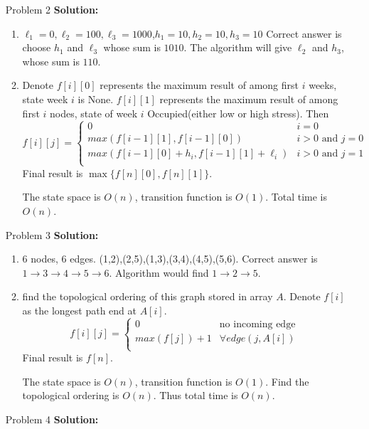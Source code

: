 \normalfont\documentclass[letterpaper,11pt]{article}
\begin{document}
\begin{enumerate}
\item [Problem 2]\textbf{Solution:}\par
	\begin{enumerate}
		\item $\ell_1 = 0, \ell_2 = 100, \ell_3 = 1000$,$h_1 = 10, h_2 = 10, h_3 = 10$
		Correct answer is choose $h_1$ and $\ell_3$ whose sum is $1010$. The algorithm will give $\ell_2$ and $h_3$, whose sum is $110$.
		\item Denote $f[i][0]$ represents the maximum result of among first $i$ weeks, state week $i$ is None. $f[i][1]$ represents the maximum result of among first $i$ nodes, state of week $i$ Occupied(either low or high stress). Then 
		$$ f[i][j]=\left\{
			\begin{array}{ll}
			0   &    i = 0\\
			max(f[i-1][1],f[i-1][0]) &           i > 0 \text{ and } j=0\\
			max(f[i-1][0] + h_i, f[i-1][1] + \ell_i)  &          i > 0 \text{ and } j = 1\\
			\end{array} \right. 
		$$
		Final result is $\max\{f[n][0],f[n][1]\}$.\par
		The state space is $O(n)$, transition function is $O(1)$. Total time is $O(n)$.
	\end{enumerate}
\item [Problem 3]\textbf{Solution:}\par
\begin{enumerate}
		\item 6 nodes, 6 edges. (1,2),(2,5),(1,3),(3,4),(4,5),(5,6).
		Correct answer is $1\to 3 \to 4\to 5 \to 6$. Algorithm would find $1\to 2 \to 5$.
		\item find the topological ordering of this graph stored in array $A$. Denote $f[i]$ as the longest path end at $A[i]$.
		$$ f[i][j]=\left\{
			\begin{array}{ll}
			0   &    \text{no incoming edge} \\
			max(f[j]) + 1 &           \forall edge (j,A[i])\\
			\end{array} \right. 
		$$
		Final result is $f[n]$.\par
		The state space is $O(n)$, transition function is $O(1)$. Find the topological ordering is $O(n)$. Thus total time is $O(n)$.
	\end{enumerate}
\item [Problem 4]\textbf{Solution:}\par
	\begin{enumerate}

\end{enumerate}
\end{enumerate}
\end{document}
